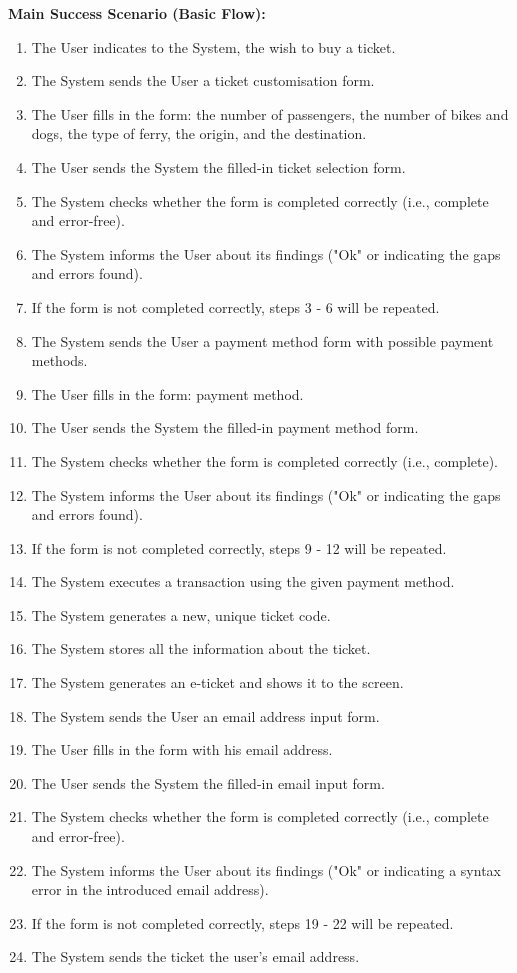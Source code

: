 \textbf{Main Success Scenario (Basic Flow):}
\begin{enumerate}
\item The User indicates to the System, the wish to buy a ticket.
\item The System sends the User a ticket customisation form.
\item The User fills in the form: the number of passengers, the number of bikes and dogs, the type of ferry, the origin, and the destination.
\item The User sends the System the filled-in ticket selection form.
\item The System checks whether the form is completed correctly (i.e., complete and error-free).
\item The System informs the User about its findings ("Ok" or indicating the gaps and errors found).
\item If the form is not completed correctly, steps 3 - 6 will be repeated.
\item The System sends the User a payment method form with possible payment methods.
\item The User fills in the form: payment method.
\item The User sends the System the filled-in payment method form.
\item The System checks whether the form is completed correctly (i.e., complete).
\item The System informs the User about its findings ("Ok" or indicating the gaps and errors found).
\item If the form is not completed correctly, steps 9 - 12 will be repeated.
\item The System executes a transaction using the given payment method.
\item The System generates a new, unique ticket code.
\item The System stores all the information about the ticket.
\item The System generates an e-ticket and shows it to the screen.
\item The System sends the User an email address input form.
\item The User fills in the form with his email address.
\item The User sends the System the filled-in email input form.
\item The System checks whether the form is completed correctly (i.e., complete and error-free).
\item The System informs the User about its findings ("Ok" or indicating a syntax error in the introduced email address).
\item If the form is not completed correctly, steps 19 - 22 will be repeated.
\item The System sends the ticket the user's email address.
\end{enumerate}
